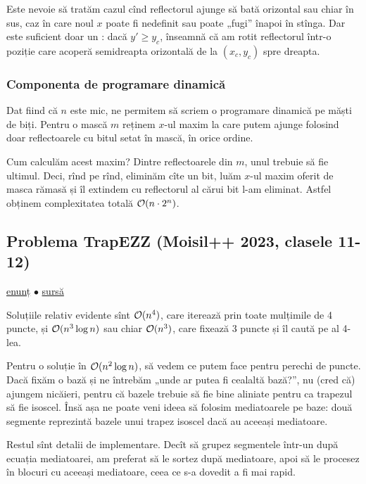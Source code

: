 \documentclass[../main.tex]{subfiles}
\begin{document}
Este nevoie să tratăm cazul cînd reflectorul ajunge să bată orizontal sau chiar în sus, caz în care noul $x$ poate fi nedefinit sau poate „fugi” înapoi în stînga. Dar este suficient doar un : dacă $y' \geq y_c$, înseamnă că am rotit reflectorul într-o poziție care acoperă semidreapta orizontală de la $(x_c,y_c)$ spre dreapta.

\subsubsection*{Componenta de programare dinamică}

Dat fiind că $n$ este mic, ne permitem să scriem o programare dinamică pe măști de biți. Pentru o mască $m$ reținem $x$-ul maxim la care putem ajunge folosind doar reflectoarele cu bitul setat în mască, în orice ordine.

Cum calculăm acest maxim? Dintre reflectoarele din $m$, unul trebuie să fie ultimul. Deci, rînd pe rînd, eliminăm cîte un bit, luăm $x$-ul maxim oferit de masca rămasă și îl extindem cu reflectorul al cărui bit l-am eliminat. Astfel obținem complexitatea totală $\mathcal{O}(n \cdot 2^n)$.

\subsection{Problema TrapEZZ (Moisil++ 2023, clasele 11-12)}
\label{problem:trapezz}

\href{https://kilonova.ro/problems/2093}{enunț}
$\bullet$
\hyperref[code:trapezz]{sursă}

Soluțiile relativ evidente sînt $\mathcal{O}(n^4)$, care iterează prin toate mulțimile de 4 puncte, și $\mathcal{O}(n^3 \log n)$ sau chiar $\mathcal{O}(n^3)$, care fixează 3 puncte și îl caută pe al 4-lea.

Pentru o soluție în $\mathcal{O}(n^2 \log n)$, să vedem ce putem face pentru perechi de puncte. Dacă fixăm o bază și ne întrebăm „unde ar putea fi cealaltă bază?”, nu (cred că) ajungem nicăieri, pentru că bazele trebuie să fie bine aliniate pentru ca trapezul să fie isoscel. Însă așa ne poate veni ideea să folosim mediatoarele pe baze: două segmente reprezintă bazele unui trapez isoscel dacă au aceeași mediatoare.

Restul sînt detalii de implementare. Decît să grupez segmentele într-un  după ecuația mediatoarei, am preferat să le sortez după mediatoare, apoi să le procesez în blocuri cu aceeași mediatoare, ceea ce s-a dovedit a fi mai rapid.
\end{document}
